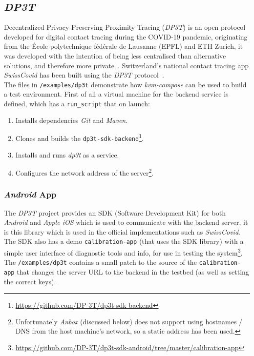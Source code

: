 \documentclass[
    author={Jacob Daniel Halsey},
    supervisor={Prof. Awais Rashid},
    degree={BSc},
    title={Building a Testbed for Evaluating Privacy Enhancing Technologies  (PETs)},
    subtitle={},
    type={software development},
    year={2021}
]{dissertation}
\begin{document}
\subsection{\emph{DP3T}}

Decentralized Privacy-Preserving Proximity Tracing (\emph{DP3T}) is an open protocol developed for
digital contact tracing during the COVID-19 pandemic, originating from the École polytechnique fédérale 
de Lausanne (EPFL) and ETH Zurich, it was developed with the intention of being less centralised
than alternative solutions, and therefore more private~\cite{busvine_2020}. 
Switzerland's national contact tracing app \emph{SwissCovid} 
has been built using the \emph{DP3T} protocol~\cite{swisscovid}. \\

The files in \texttt{/examples/dp3t} demonstrate how \emph{kvm-compose} can be used to build
a test environment. First of all a virtual machine for the backend service is defined,
which has a \texttt{run\_script} that on launch:

\begin{singlespace}
	\begin{enumerate}
		\item Installs dependencies \emph{Git} and \emph{Maven}.
		\item Clones and builds the 
		\texttt{dp3t-sdk-backend}\footnote{\url{https://github.com/DP-3T/dp3t-sdk-backend}}.
		\item Installs and runs \emph{dp3t} as a service.
		\item Configures the network address of the server\footnote{
			Unfortunately \emph{Anbox} (discussed below) does not support using hostnames / DNS from 
			the host machine's network, so a static address has been used.}.
	\end{enumerate}
\end{singlespace}

\subsubsection{\emph{Android} App}
\label{sect:android}

The \emph{DP3T} project provides an SDK (Software Development Kit) 
for both \emph{Android} and \emph{Apple iOS} which
is used to communicate with the backend server, it is this library which is used in the official
implementations such as \emph{SwissCovid}. The SDK also has a demo \texttt{calibration-app} (that uses
the SDK library) with a simple user interface of diagnostic tools and info, for use in testing the 
system\footnote{\url{https://github.com/DP-3T/dp3t-sdk-android/tree/master/calibration-app}}.
The \texttt{/examples/dp3t} contains a small patch to the source of the \texttt{calibration-app} that
changes the server URL to the backend in the testbed (as well as setting the correct keys). \\
\end{document}
